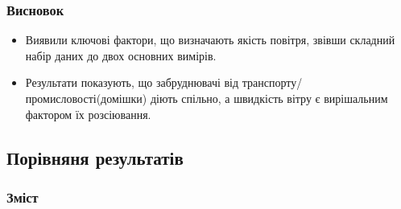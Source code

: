 \documentclass{beamer}
\begin{document}
\begin{frame}
  \frametitle{Висновок}
  \begin{itemize}
    \item Виявили ключові фактори, що визначають якість повітря,
     звівши складний набір даних до двох основних вимірів.
    \item Результати показують, що забруднювачі від транспорту/промисловості(домішки) діють спільно,
     а швидкість вітру є вирішальним фактором їх розсіювання.
  \end{itemize}
\end{frame}

\begin{frame}
  \section{Порівняня результатів}

  \frametitle{Зміст}
  \tableofcontents[currentsection]
\end{frame}
\end{document}
